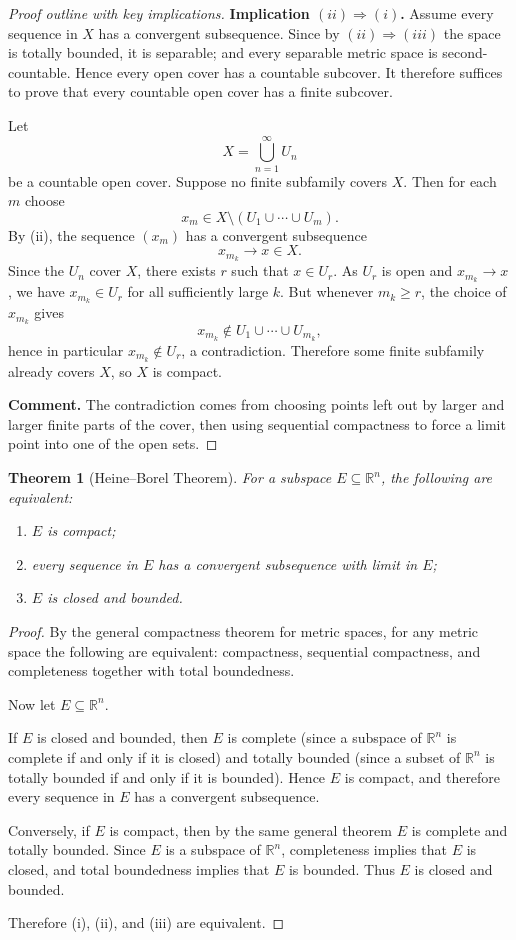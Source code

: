 \documentclass[12pt]{article}
\newtheorem{theorem}{Theorem}
\begin{document}
\begin{proof}[Proof outline with key implications]
\noindent\textbf{Implication $(ii)\Rightarrow(i)$.}
Assume every sequence in $X$ has a convergent subsequence. Since by $(ii)\Rightarrow(iii)$ the space is totally bounded, it is separable; and every separable metric space is second-countable. Hence every open cover has a countable subcover. It therefore suffices to prove that every countable open cover has a finite subcover.

Let
\[
X=\bigcup_{n=1}^\infty U_n
\]
be a countable open cover. Suppose no finite subfamily covers $X$. Then for each $m$ choose
\[
x_m\in X\setminus (U_1\cup\cdots\cup U_m).
\]
By (ii), the sequence $(x_m)$ has a convergent subsequence
\[
x_{m_k}\to x\in X.
\]
Since the $U_n$ cover $X$, there exists $r$ such that $x\in U_r$. As $U_r$ is open and $x_{m_k}\to x$, we have $x_{m_k}\in U_r$ for all sufficiently large $k$. But whenever $m_k\ge r$, the choice of $x_{m_k}$ gives
\[
x_{m_k}\notin U_1\cup\cdots\cup U_{m_k},
\]
hence in particular $x_{m_k}\notin U_r$, a contradiction. Therefore some finite subfamily already covers $X$, so $X$ is compact.

\medskip

\noindent\textbf{Comment.} The contradiction comes from choosing points left out by larger and larger finite parts of the cover, then using sequential compactness to force a limit point into one of the open sets.

\end{proof}

\begin{theorem}[Heine--Borel Theorem]
For a subspace $E \subseteq \mathbb{R}^n$, the following are equivalent:
\begin{enumerate}[label=(\roman*)]
\item $E$ is compact;
\item every sequence in $E$ has a convergent subsequence with limit in $E$;
\item $E$ is closed and bounded.
\end{enumerate}
\end{theorem}

\begin{proof}
By the general compactness theorem for metric spaces, for any metric space the following are equivalent:
compactness, sequential compactness, and completeness together with total boundedness.

Now let $E \subseteq \mathbb{R}^n$.

If $E$ is closed and bounded, then $E$ is complete (since a subspace of $\mathbb{R}^n$ is complete if and only if it is closed) and totally bounded (since a subset of $\mathbb{R}^n$ is totally bounded if and only if it is bounded). Hence $E$ is compact, and therefore every sequence in $E$ has a convergent subsequence.

Conversely, if $E$ is compact, then by the same general theorem $E$ is complete and totally bounded. Since $E$ is a subspace of $\mathbb{R}^n$, completeness implies that $E$ is closed, and total boundedness implies that $E$ is bounded. Thus $E$ is closed and bounded.

Therefore (i), (ii), and (iii) are equivalent.
\end{proof}
\end{document}

